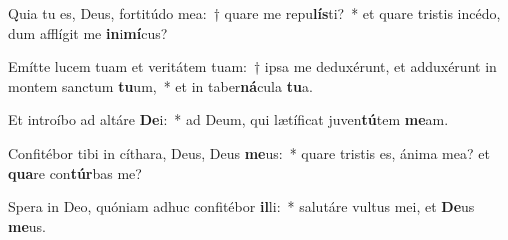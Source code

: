\item Quia tu es, Deus, fortitúdo mea:~† quare me repu\textbf{lís}ti?~* et quare tristis incédo, dum afflígit me \textbf{in}i\textbf{mí}cus?
\item Emítte lucem tuam et veritátem tuam:~† ipsa me deduxérunt, et adduxérunt in montem sanctum \textbf{tu}um,~* et in taber\textbf{ná}cula \textbf{tu}a.
\item Et introíbo ad altáre \textbf{De}i:~* ad Deum, qui lætíficat juven\textbf{tú}tem \textbf{me}am.
\item Confitébor tibi in cíthara, Deus, Deus \textbf{me}us:~* quare tristis es, ánima mea? et \textbf{qua}re con\textbf{túr}bas me?
\item Spera in Deo, quóniam adhuc confitébor \textbf{il}li:~* salutáre vultus mei, et \textbf{De}us \textbf{me}us.

